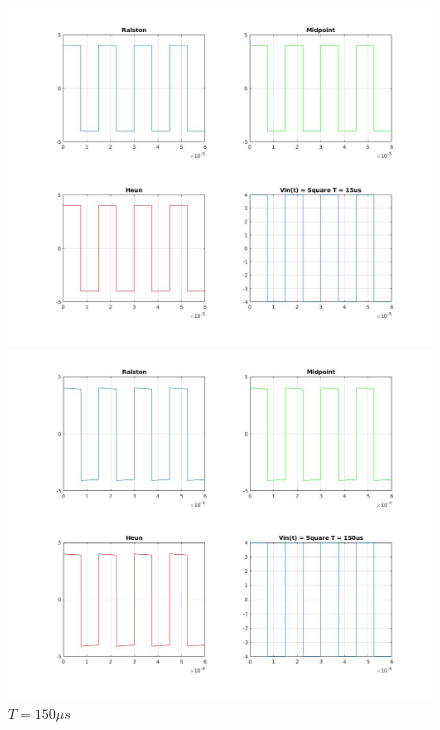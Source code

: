 \documentclass[11pt,a4paper]{article}
\begin{document}
\begin{figure}[h]
	\vspace{-5mm}
	\centering
	\includegraphics[width=.75\textwidth]{Ex1_Figs/squ15.jpg}
	\vspace{-6mm}
	\caption{$T = 15 \mu s$}
	\label{fig:RL4}
	\includegraphics[width=.75\textwidth]{Ex1_Figs/squ150.jpg}
	\vspace{-3mm}
	\caption{$T = 150 \mu s$}
	\label{fig:RL4}
\end{figure}

\pagebreak
\end{document}
